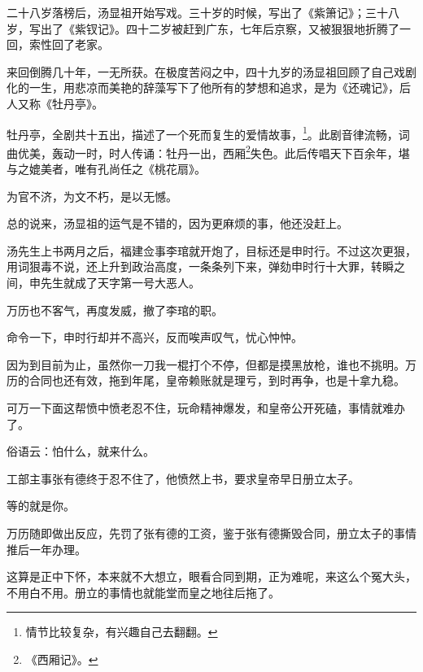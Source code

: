 \begin{multicols}{\theparacolNo}
		二十八岁落榜后，汤显祖开始写戏。三十岁的时候，写出了《紫箫记》；三十八岁，写出了《紫钗记》。四十二岁被赶到广东，七年后京察，又被狠狠地折腾了一回，索性回了老家。

		来回倒腾几十年，一无所获。在极度苦闷之中，四十九岁的汤显祖回顾了自己戏剧化的一生，用悲凉而美艳的辞藻写下了他所有的梦想和追求，是为《还魂记》，后人又称《牡丹亭》。

		牡丹亭，全剧共十五出，描述了一个死而复生的爱情故事，\footnote{情节比较复杂，有兴趣自己去翻翻。}。此剧音律流畅，词曲优美，轰动一时，时人传诵：牡丹一出，西厢\footnote{《西厢记》。}失色。此后传唱天下百余年，堪与之媲美者，唯有孔尚任之《桃花扇》。

		为官不济，为文不朽，是以无憾。
		\begin{quote}
			\begin{spacing}{0.5}  %
				\textit{{\footnotesize
							\begin{description}
								\item[\textcolor{Gray}{\faQuoteRight}] 史赞：二百年来，一人而已。
							\end{description}
						}}
			\end{spacing}
		\end{quote}

		总的说来，汤显祖的运气是不错的，因为更麻烦的事，他还没赶上。

		汤先生上书两月之后，福建佥事李琯就开炮了，目标还是申时行。不过这次更狠，用词狠毒不说，还上升到政治高度，一条条列下来，弹劾申时行十大罪，转瞬之间，申先生就成了天字第一号大恶人。

		万历也不客气，再度发威，撤了李琯的职。

		命令一下，申时行却并不高兴，反而唉声叹气，忧心忡忡。

		因为到目前为止，虽然你一刀我一棍打个不停，但都是摸黑放枪，谁也不挑明。万历的合同也还有效，拖到年尾，皇帝赖账就是理亏，到时再争，也是十拿九稳。

		可万一下面这帮愤中愤老忍不住，玩命精神爆发，和皇帝公开死磕，事情就难办了。

		俗语云：怕什么，就来什么。

		工部主事张有德终于忍不住了，他愤然上书，要求皇帝早日册立太子。

		等的就是你。

		万历随即做出反应，先罚了张有德的工资，鉴于张有德撕毁合同，册立太子的事情推后一年办理。

		这算是正中下怀，本来就不大想立，眼看合同到期，正为难呢，来这么个冤大头，不用白不用。册立的事情也就能堂而皇之地往后拖了。


\end{multicols}

